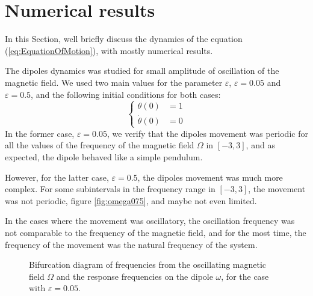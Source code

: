 \section{Numerical results}

In this Section, we\textquotesingle ll briefly discuss the dynamics of the equation (\ref{eq:EquationOfMotion}), with mostly numerical results. 

The dipole\textquotesingle s dynamics was studied for small amplitude of oscillation of the magnetic field. We used two main values for the parameter $\varepsilon$, $\varepsilon = 0.05$ and $\varepsilon = 0.5$, and the following initial conditions for both cases:
\begin{equation}
    \begin{cases}
        \theta (0) &= 1\\        
        \dot{\theta}(0) &= 0
    \end{cases}
\end{equation} 
In the former case, $\varepsilon = 0.05$, we verify that the dipole\textquotesingle s movement was periodic for all the values of the frequency of the magnetic field $\Omega$ in $[-3,3]$, and as expected, the dipole behaved like a simple pendulum. 

However, for the latter case, $\varepsilon = 0.5$, the dipole\textquotesingle s movement was much more complex. For some subintervals in the frequency range in $[-3,3]$, the movement was not periodic, figure \ref{fig:omega075}, and maybe not even limited. 

In the cases where the movement was oscillatory, the oscillation frequency was not comparable to the frequency of the magnetic field, and for the most time, the frequency of the movement was the natural frequency of the system. 

\begin{figure}
    \centering
    \scalebox{0.7}{}
    \caption{Bifurcation diagram of frequencies from the oscillating magnetic field $\Omega$ and the response frequencies on the dipole $\omega$, for the case with $\varepsilon = 0.05$.}
    \label{fig:bif005}
\end{figure}


